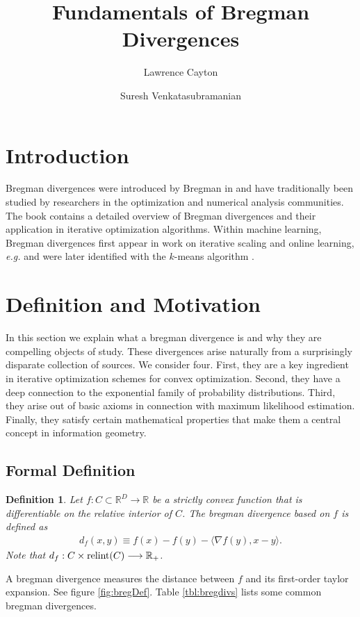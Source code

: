 \documentclass{article}
\title{Fundamentals of Bregman Divergences}
\author{Lawrence Cayton \and Suresh Venkatasubramanian}
\newtheorem{define}{Definition}
\newcommand{\R}{\mathbb{R}}
\newcommand{\relint}{\mbox{\textup{relint}}}
\begin{document}
\maketitle

\section{Introduction}
Bregman divergences were introduced by Bregman in \cite{b.67} and have
traditionally been studied by researchers in the optimization and
numerical analysis communities.  The book \cite{cz.97} contains a
detailed overview of Bregman divergences and their application in
iterative optimization algorithms.  Within machine learning, Bregman
divergences first appear in work on iterative scaling \cite{ldd.97}
and online learning, \textit{e.g.} 
\cite{gls.97,hw.98,aw.01} and were later identified with the $k$-means
algorithm \cite{bm.05}.   

\section{Definition and Motivation}
In this section we explain what a bregman divergence is and why they
are compelling objects of study.  These divergences arise naturally
from a surprisingly disparate collection of sources.  We consider
four.  First, they are a key ingredient in iterative optimization
schemes for convex optimization.  Second, they have a deep connection
to the exponential family of probability distributions.  Third, they
arise out of basic axioms in connection with maximum likelihood
estimation.  Finally, they satisfy certain mathematical properties
that make them a central concept in information geometry.  

\subsection{Formal Definition}
\begin{define}
Let $f:C \subset \R^D \rightarrow \R$ be a strictly convex function that is
differentiable on the relative interior of $C$.  The bregman divergence based
on $f$ is defined as
\begin{align*}
  d_f(x,y) \equiv f(x) - f(y) - \langle \nabla f(y),x-y \rangle.  
\end{align*}
Note that $d_f:C \times \relint(C) \longrightarrow \R_+$.  
\end{define}
A bregman divergence measures the distance between $f$ and its
first-order taylor expansion.  See figure \ref{fig:bregDef}.  Table
\ref{tbl:bregdivs} lists some common bregman divergences.  
\end{document}
